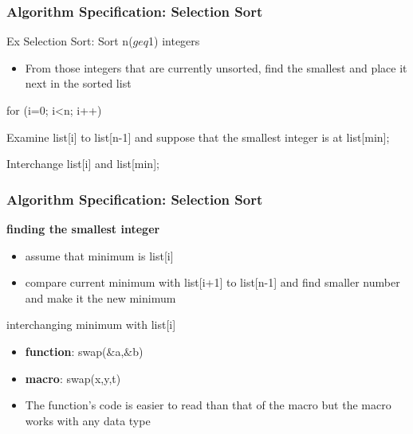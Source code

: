 \documentclass[newPxFont,sthlmFooter,nooffset]{beamer}
\begin{document}
\begin{frame}[t,fragile]
  \frametitle{Algorithm Specification: Selection Sort}
Ex Selection Sort: Sort n($geq$1) integers
\begin{itemize}
\item From those integers that are currently unsorted, find the smallest and place it next in the sorted list
\end{itemize}

\begin{codedef}
for (i=0; i<n; i++) {
    Examine list[i] to list[n-1] and suppose 
    that the smallest integer is at list[min];
  
    Interchange list[i] and list[min];
}
\end{codedef}

\end{frame}

\begin{frame}[t,fragile]
  \frametitle{Algorithm Specification: Selection Sort}

\textbf{finding the smallest integer}
\begin{itemize}
\item assume that minimum is list[i]
\item compare current minimum with list[i+1] to list[n-1] and find
  smaller number and make it the new minimum 
\end{itemize}

interchanging minimum with list[i]

\begin{itemize}
	\item\textbf{function}: swap($\&$a,$\&$b)
\end{itemize}

\begin{itemize}
	\item\textbf{macro}: swap(x,y,t)
\end{itemize}
\begin{itemize}
	\item The function's code is easier to read than that of the macro but the macro works with any data type
\end{itemize}
\end{frame}
\end{document}
